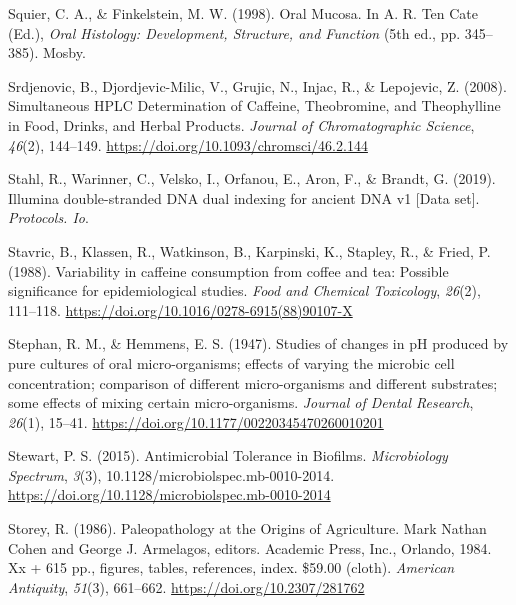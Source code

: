 \documentclass[
  letterpaper,
]{book}
\newlength{\cslhangindent}
\newlength{\cslentryspacingunit} %
\newenvironment{CSLReferences}[2] %
 {%
  \setlength{\parindent}{0pt}
  \ifodd #1
  \let\oldpar\par
  \def\par{\hangindent=\cslhangindent\oldpar}
  \fi
  \setlength{\parskip}{#2\cslentryspacingunit}
 }%
 {}
\begin{document}
\begin{CSLReferences}{1}{0}
\leavevmode{}%
Squier, C. A., \& Finkelstein, M. W. (1998). Oral {Mucosa}. In A. R. Ten
Cate (Ed.), \emph{Oral {Histology}: {Development}, {Structure}, and
{Function}} (5th ed., pp. 345--385). {Mosby}.

\leavevmode{}%
Srdjenovic, B., Djordjevic-Milic, V., Grujic, N., Injac, R., \&
Lepojevic, Z. (2008). Simultaneous {HPLC Determination} of {Caffeine},
{Theobromine}, and {Theophylline} in {Food}, {Drinks}, and {Herbal
Products}. \emph{Journal of Chromatographic Science}, \emph{46}(2),
144--149. \url{https://doi.org/10.1093/chromsci/46.2.144}

\leavevmode{}%
Stahl, R., Warinner, C., Velsko, I., Orfanou, E., Aron, F., \& Brandt,
G. (2019). Illumina double-stranded {DNA} dual indexing for ancient
{DNA} v1 {[}{Data} set{]}. \emph{Protocols. Io}.

\leavevmode{}%
Stavric, B., Klassen, R., Watkinson, B., Karpinski, K., Stapley, R., \&
Fried, P. (1988). Variability in caffeine consumption from coffee and
tea: {Possible} significance for epidemiological studies. \emph{Food and
Chemical Toxicology}, \emph{26}(2), 111--118.
\url{https://doi.org/10.1016/0278-6915(88)90107-X}

\leavevmode{}%
Stephan, R. M., \& Hemmens, E. S. (1947). Studies of changes in {pH}
produced by pure cultures of oral micro-organisms; effects of varying
the microbic cell concentration; comparison of different micro-organisms
and different substrates; some effects of mixing certain
micro-organisms. \emph{Journal of Dental Research}, \emph{26}(1),
15--41. \url{https://doi.org/10.1177/00220345470260010201}

\leavevmode{}%
Stewart, P. S. (2015). Antimicrobial {Tolerance} in {Biofilms}.
\emph{Microbiology Spectrum}, \emph{3}(3),
10.1128/microbiolspec.mb-0010-2014.
\url{https://doi.org/10.1128/microbiolspec.mb-0010-2014}

\leavevmode{}%
Storey, R. (1986). Paleopathology at the {Origins} of {Agriculture}.
{Mark Nathan Cohen} and {George J}. {Armelagos}, editors. {Academic
Press}, {Inc}., {Orlando}, 1984. Xx + 615 pp., figures, tables,
references, index. \$59.00 (cloth). \emph{American Antiquity},
\emph{51}(3), 661--662. \url{https://doi.org/10.2307/281762}


\end{CSLReferences}
\end{document}
